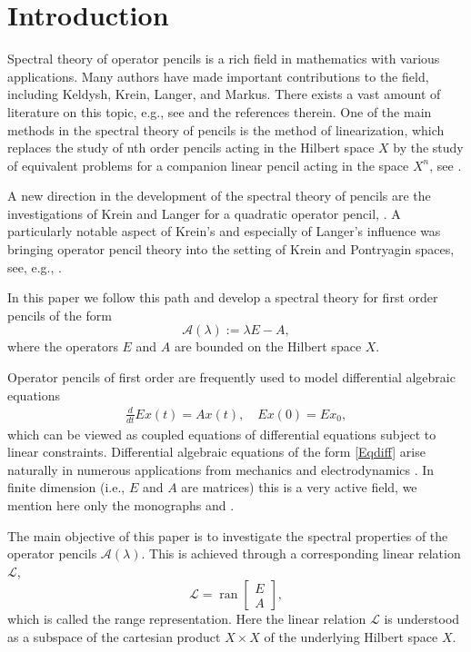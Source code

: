 \documentclass{birkjour}
\theoremstyle{definition}
\theoremstyle{remark}
\numberwithin{equation}{section}
\newcommand{\Ll}{\mathcal L}
\DeclareMathOperator{\ran}{ran}
\begin{document}
\section{Introduction}
Spectral theory of operator pencils is a rich field in mathematics with various applications. Many authors have made important contributions to the field, including Keldysh, Krein, Langer, and Markus. There exists a vast amount of literature on this topic, e.g., see \cite{K51, KL78II, M88, MV15} and the references therein. 
One of the main methods in the spectral theory of pencils is the method of linearization, which replaces the study of nth order pencils acting in the Hilbert space $X$ by the study of equivalent problems for a companion linear pencil acting in the space $X^n$, see \cite{M88}.

A new direction in the development of the spectral theory of pencils are the investigations of Krein and  Langer for a quadratic operator pencil, \cite{ALM01, KL78I, KL78II, L76}. A particularly notable aspect of Krein's and especially of Langer’s influence was bringing operator pencil theory into the setting of Krein and Pontryagin spaces, see, e.g., \cite{L67,L73,L74,L75,L76}. 

In this 
paper we follow this path and develop a spectral theory for first order pencils of the form  
 \begin{equation}\label{Rakete}
     \mathcal{A}(\lambda) := \lambda E-A,
 \end{equation}
 where the operators $E$ and $A$ are bounded on the Hilbert space $X$. 

Operator pencils of first order are frequently used to model differential
algebraic equations \begin{align}\label{Eqdiff}
    \frac{d}{dt} E x(t)= A x(t), \quad E x(0) = E x_0,
\end{align}
 which can be viewed as coupled equations of differential equations subject to linear constraints. Differential algebraic equations of the form \eqref{Eqdiff} arise naturally in numerous applications from mechanics and electrodynamics \cite{FY98, RT05, TW19}. In finite dimension (i.e., $E$ and $A$ are matrices) this is a very active field, we mention here only the monographs 
 \cite{KM06} and \cite{LMT13}.
 
 The main objective of this paper is to investigate the spectral properties of the operator pencils  $\mathcal{A}(\lambda)$.
This is achieved through a corresponding linear relation $\Ll$,
\begin{equation} \label{range-kernel}
	\mathcal{L} = \ran\begin{bmatrix}
			E\\ A
			\end{bmatrix}, %
\end{equation} 
which is called the range representation. Here the linear relation $\Ll$ is understood as a subspace of the cartesian product $X\times X$ of the underlying Hilbert space $X$.
\end{document}
